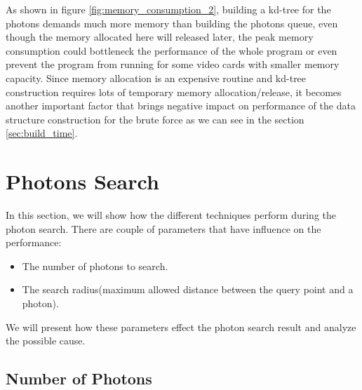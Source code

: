 As shown in figure \ref{fig:memory_consumption_2}, building a kd-tree for the photons demands much more memory than building the photons queue, even though the memory allocated here will released later, the peak memory consumption could bottleneck the performance of the whole program or even prevent the program from running for some video cards with smaller memory capacity. Since memory allocation is an expensive routine and kd-tree construction requires lots of temporary memory allocation/release, it becomes another important factor that brings negative impact on performance of the data structure construction for the brute force as we can see in the section \ref{sec:build_time}.

\section{Photons Search}

In this section, we will show how the different techniques perform during the photon search. There are couple of parameters that have influence on the performance:

\begin{itemize}

\item{The number of photons to search. }

\item{The search radius(maximum allowed distance between the query point and a photon). }

\end{itemize}

We will present how these parameters effect the photon search result and analyze the possible cause.

\subsection{Number of Photons}

